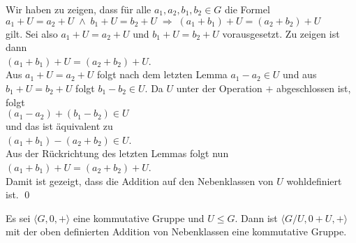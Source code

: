 \proof
Wir haben zu zeigen, dass f\"{u}r alle $a_1,a_2,b_1,b_2 \in G$ die Formel
\\[0.2cm]
\hspace*{1.3cm}
$a_1 + U = a_2 + U \;\wedge\; b_1 + U = b_2 + U \;\Rightarrow\; (a_1 + b_1) + U = (a_2 + b_2) + U$
\\[0.2cm]
gilt.  Sei also $a_1 + U = a_2 + U$ und $b_1 + U = b_2 + U$ vorausgesetzt.  
Zu zeigen ist dann
\\[0.2cm]
\hspace*{1.3cm}
$(a_1 + b_1) + U = (a_2 + b_2) + U$.
\\[0.2cm]
Aus $a_1 + U = a_2 + U$ folgt nach dem letzten Lemma $a_1 - a_2 \in U$  und aus
$b_1 + U = b_2 + U$ folgt $b_1 - b_2 \in U$.  Da $U$ unter der Operation $+$ abgeschlossen ist, folgt
\\[0.2cm]
\hspace*{1.3cm}
$(a_1 - a_2) + (b_1 - b_2) \in U$
\\[0.2cm]
und das ist \"{a}quivalent zu
\\[0.2cm]
\hspace*{1.3cm}
$(a_1 + b_1) - (a_2 + b_2) \in U$.
\\[0.2cm]
Aus der R\"{u}ckrichtung des letzten  Lemmas folgt nun
\\[0.2cm]
\hspace*{1.3cm}
$(a_1 + b_1) + U = (a_2 + b_2) + U$.
\\[0.2cm]
Damit ist gezeigt, dass die Addition auf den Nebenklassen von $U$ wohldefiniert ist. 
\qed

\begin{Satz}
 Es sei $\langle G, 0, + \rangle$ eine kommutative Gruppe und $U \leq G$.
 Dann ist $\langle G/U, 0 + U, + \rangle$ mit der oben definierten Addition von Nebenklassen eine kommutative Gruppe.
\end{Satz}

